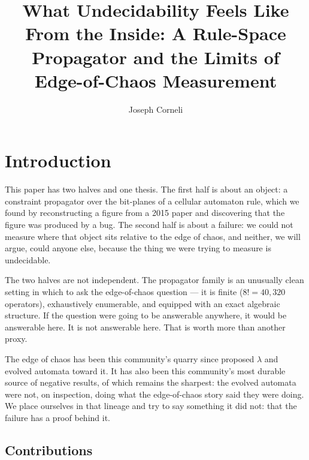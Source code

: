 \documentclass[man,12pt,floatsintext]{apa7}
\title{What Undecidability Feels Like From the Inside: A Rule-Space
Propagator and the Limits of Edge-of-Chaos Measurement}
\author{Joseph Corneli}
\affiliation{Hyperreal Enterprises}
\newif\ifdraftnotes
\newcommand{\dnote}[1]{\ifdraftnotes\textcolor{notecol}{\small\textbf{[NOTE:} #1\textbf{]}}\fi}
\begin{document}
\maketitle

\section{Introduction}

\dnote{Intro is the least-settled prose in the draft. It currently states
the thesis and the route. It does not yet \emph{sell} --- the ALife framing
(Langton's $\lambda$ as this community's long-running quarry) should
probably arrive in the first paragraph rather than the third.}

This paper has two halves and one thesis. The first half is about an
object: a constraint propagator over the bit-planes of a cellular
automaton rule, which we found by reconstructing a figure from a 2015
paper \parencite{corneli2015search} and discovering that the figure was
produced by a bug. The second half is about a failure: we could not
measure where that object sits relative to the edge of chaos, and neither,
we will argue, could anyone else, because the thing we were trying to
measure is undecidable.

The two halves are not independent. The propagator family is an unusually
clean setting in which to ask the edge-of-chaos question --- it is finite
($8! = 40{,}320$ operators), exhaustively enumerable, and equipped with an
exact algebraic structure. If the question were going to be answerable
anywhere, it would be answerable here. It is not answerable here. That is
worth more than another proxy.

The edge of chaos has been this community's quarry since
\textcite{langton1990computation} proposed $\lambda$ and
\textcite{packard1988adaptation} evolved automata toward it. It has also
been this community's most durable source of negative results, of which
\textcite{mitchell1993revisiting} remains the sharpest: the evolved
automata were not, on inspection, doing what the edge-of-chaos story said
they were doing. We place ourselves in that lineage and try to say
something it did not: that the failure has a proof behind it.

\subsection{Contributions}
\end{document}
